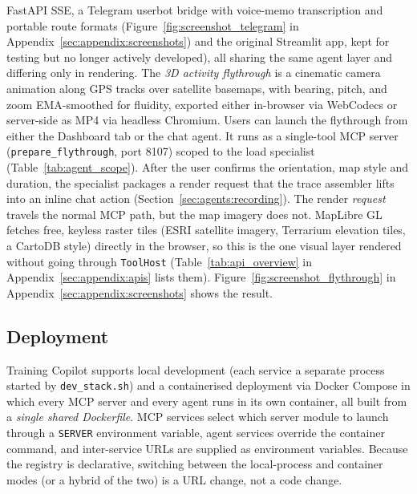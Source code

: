 FastAPI SSE, a Telegram userbot bridge with voice-memo transcription and portable route formats (Figure~\ref{fig:screenshot_telegram} in Appendix~\ref{sec:appendix:screenshots}) and the original Streamlit app, kept for testing but no longer actively developed), all sharing the same agent layer and differing only in rendering. The \textit{3D activity flythrough} is a cinematic camera animation along GPS tracks over satellite basemaps, with bearing, pitch, and zoom EMA-smoothed for fluidity, exported either in-browser via WebCodecs or server-side as MP4 via headless Chromium. Users can launch the flythrough from either the Dashboard tab or the chat agent. It runs as a single-tool MCP server (\texttt{prepare\_flythrough}, port 8107) scoped to the load specialist (Table~\ref{tab:agent_scope}). After the user confirms the orientation, map style and duration, the specialist packages a render request that the trace assembler lifts into an inline chat action (Section~\ref{sec:agents:recording}). The render \textit{request} travels the normal MCP path, but the map imagery does not. MapLibre GL fetches free, keyless raster tiles (ESRI satellite imagery, Terrarium elevation tiles, a CartoDB style) directly in the browser, so this is the one visual layer rendered without going through \texttt{ToolHost} (Table~\ref{tab:api_overview} in Appendix~\ref{sec:appendix:apis} lists them). Figure~\ref{fig:screenshot_flythrough} in Appendix~\ref{sec:appendix:screenshots} shows the result.

\subsection{Deployment}\label{sec:architecture:deployment}

Training Copilot supports local development (each service a separate process started by \texttt{dev\_stack.sh}) and a containerised deployment via Docker Compose in which every MCP server and every agent runs in its own container, all built from a \textit{single shared Dockerfile}. MCP services select which server module to launch through a \texttt{SERVER} environment variable, agent services override the container command, and inter-service URLs are supplied as environment variables. Because the registry is declarative, switching between the local-process and container modes (or a hybrid of the two) is a URL change, not a code change.
